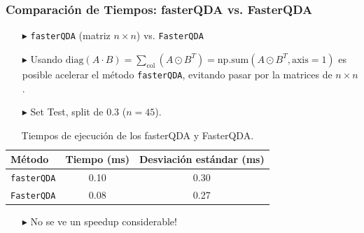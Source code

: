 \begin{frame}
  \frametitle{Comparación de Tiempos: fasterQDA vs. FasterQDA}

    \begin{itemize}
    \item[$\blacktriangleright$] \texttt{fasterQDA} (matriz \(n \times n\)) vs. \texttt{FasterQDA} 
  \end{itemize}
  \vspace{0.4cm}
  \begin{itemize}
    \item[$\blacktriangleright$] Usando \( \text{diag}(A \cdot B) = \sum_{\text{col}}(A \odot B^T) = \text{np.sum}(A \odot B^T, \text{axis}=1) \) es posible acelerar el método \texttt{fasterQDA}, evitando pasar por la matrices de \( n \times n\).
    \item[$\blacktriangleright$] Set Test, split de 0.3 ($n=45$).
  \end{itemize}

  \begin{table}[h!]
      \centering
      \begin{tabular}{@{}lcc@{}}
        \toprule
        \textbf{Método}      & Tiempo (ms)           & Desviación estándar (ms) \\ 
        \midrule
        \texttt{fasterQDA}   & 0.10              & 0.30                 \\ 
        \texttt{FasterQDA}   & 0.08              & 0.27                 \\ 
        \bottomrule
      \end{tabular}
      \caption{Tiempos de ejecución de los fasterQDA y FasterQDA.}
  \end{table}

  \begin{itemize}
    \item[$\blacktriangleright$] No se ve un speedup considerable!
  \end{itemize}

\end{frame}


